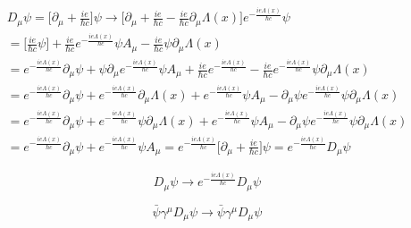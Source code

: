 \documentclass[a4]{article}
\begin{document}
    \begin{equation}
        \begin{aligned}
            D_{\mu} \psi = \Big[ \partial_{\mu} + \frac{i e}{\hbar c} \Big] \psi \rightarrow \Big[ \partial_{\mu} + \frac{i e}{\hbar c} - \frac{i e}{\hbar c} \partial_{\mu} \Lambda (x) \Big] e^{- \frac{i e \Lambda (x)}{\hbar c}} \psi \\
            = \Big[ \frac{i e}{\hbar c} \psi \Big] + \frac{i e}{\hbar c} e^{- \frac{i e \Lambda (x)}{\hbar c}} \psi A_{\mu} - \frac{i e}{\hbar c} \psi \partial_{\mu} \Lambda (x) \\
            = e^{- \frac{i e \Lambda (x)}{\hbar c}} \partial_{\mu} \psi + \psi \partial_{\mu} e^{- \frac{i e \Lambda (x)}{\hbar c}} \psi A_{\mu} + \frac{i e}{\hbar c} e^{- \frac{i e \Lambda (x)}{\hbar c}} -  \frac{i e}{\hbar c} e^{- \frac{i e \Lambda (x)}{\hbar c}} \psi \partial_{\mu} \Lambda (x) \\
            = e^{- \frac{i e \Lambda (x)}{\hbar c}} \partial_{\mu} \psi + e^{- \frac{i e \Lambda (x)}{\hbar c}} \partial_{\mu} \Lambda (x) + e^{- \frac{i e \Lambda (x)}{\hbar c}} \psi A_{\mu} - \partial_{\mu} \psi e^{- \frac{i e \Lambda (x)}{\hbar c}} \psi \partial_{\mu} \Lambda (x) \\
            = e^{- \frac{i e \Lambda (x)}{\hbar c}} \partial_{\mu} \psi + e^{- \frac{i e \Lambda (x)}{\hbar c}} \psi \partial_{\mu} \Lambda (x) + e^{- \frac{i e \Lambda (x)}{\hbar c}} \psi A_{\mu} - \partial_{\mu} \psi e^{- \frac{i e \Lambda (x)}{\hbar c}} \psi \partial_{\mu} \Lambda (x) \\
            = e^{- \frac{i e \Lambda (x)}{\hbar c}} \partial_{\mu} \psi + e^{- \frac{i e \Lambda (x)}{\hbar c}} \psi A_{\mu} = e^{- \frac{i e \Lambda (x)}{\hbar c}} \Big[ \partial_{\mu} + \frac{i e}{\hbar c} \Big] \psi = e^{- \frac{i e \Lambda (x)}{\hbar c}} D_{\mu} \psi
        \end{aligned}
    \end{equation}

    \begin{framed}
        \begin{equation}
            D_{\mu} \psi \rightarrow e^{- \frac{i e \Lambda (x)}{\hbar c}} D_{\mu} \psi
        \end{equation}
    \end{framed}

    \begin{framed}
        \begin{equation}
            \bar{\psi} \gamma^{\mu} D_{\mu} \psi \rightarrow \bar{\psi} \gamma^{\mu} D_{\mu} \psi
        \end{equation}
    \end{framed}
\end{document}
